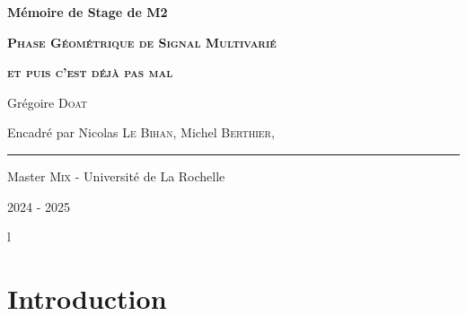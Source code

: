 





\begin{titlepage}
	
	\centering
	\vspace{1.5cm}
	{\huge\textbf{Mémoire de Stage de M2}}\par
	
	\vspace{2cm}
	{\huge\textbf{\textsc{Phase Géométrique de Signal Multivarié}}}\par 
	\vspace{0.5cm}
	
	{\huge\textbf{\textsc{et puis c'est déjà pas mal}}}\par
	\vspace{2.0cm}
	
	{\large Grégoire \textsc{Doat}}\par
	\vspace{0.5cm}
	\vfill
	
	{\large Encadré par Nicolas \textsc{Le Bihan},  Michel \textsc{Berthier}, \etal}\par
	\vspace{0.5cm}
	
	\rule{10cm}{0.4pt}\par
	\vspace{0.7cm}
	
	{Master \textsc{Mix} - Université de La Rochelle}\par
	\vspace{0.25cm}
	
	{\large 2024 - 2025}
\end{titlepage}

\newpage
\tableofcontents
\thispagestyle{empty}
{\color{white}l}


\newpage
\setcounter{page}{1}



\newpage

{}
\section*{Introduction}


